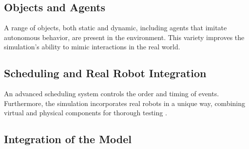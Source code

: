 \subsection{Objects and Agents}
A range of objects, both static and dynamic, including agents that imitate autonomous behavior, are present in the environment. This variety improves the simulation's ability to mimic interactions in the real world.
\subsection{Scheduling and Real Robot Integration}
An advanced scheduling system controls the order and timing of events. Furthermore, the simulation incorporates real robots in a unique way, combining virtual and physical components for thorough testing \cite{Bachlorsthesis}.
\subsection{Integration of the Model}

